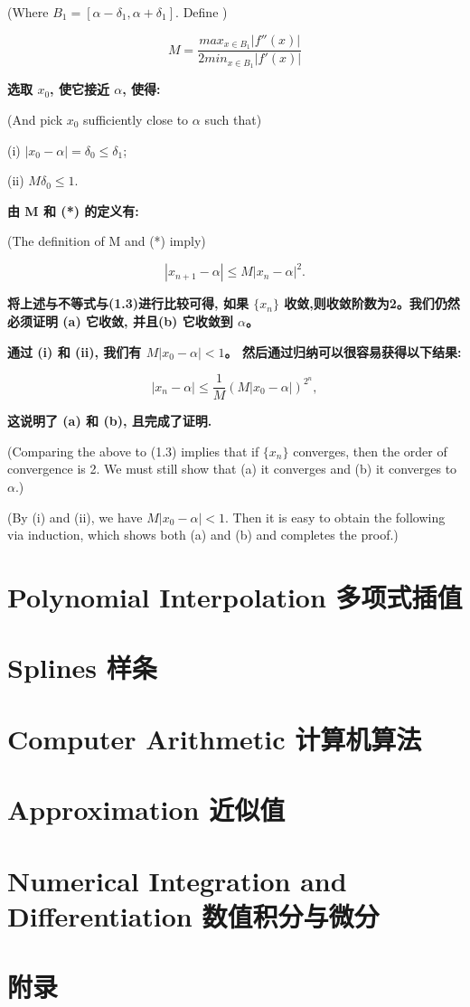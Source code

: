 \documentclass{ctexart}
\begin{document}
(Where $B_1 = [\alpha-\delta _1, \alpha + \delta _1]$. Define )

\[
M = \frac{max_{x \in B_1}|f''(x)|}{2min_{x \in B_1}|f'(x)|}
\]

\textbf{选取 $x_0$, 使它接近 $\alpha$, 使得:}

(And pick $x_0$ sufficiently close to $\alpha$ such that)

(i) $|x_0 - \alpha| = \delta_0 \le \delta_1$;

(ii) $M \delta_0 \le 1$.

\textbf{由 M 和 (*) 的定义有:}

(The definition of M and (*) imply)

\[
|x_{n+1} - \alpha| \le M|x_n - \alpha|^2.
\]

\textbf{将上述与不等式与(1.3)进行比较可得, 如果 $\{x_n\}$ 收敛,则收敛阶数为2。我们仍然必须证明 (a) 它收敛, 并且(b) 它收敛到 $\alpha$。}

\textbf{通过 (i) 和 (ii), 我们有 $M|x_0 − \alpha| < 1$。 然后通过归纳可以很容易获得以下结果:}

\[
|x_n - \alpha| \le \frac{1}{M}(M|x_0 - \alpha|)^{2^n},
\]

\textbf{这说明了 (a) 和 (b), 且完成了证明.}

(Comparing the above to (1.3) implies that if $\{x_n\}$ converges, then the order of convergence is 2. We must still show that (a) it converges and (b) it converges to $\alpha$.)

(By (i) and (ii), we have $M |x_0 − \alpha| < 1$. Then it is easy to obtain the following via induction, which shows both (a) and (b) and completes the proof.)


\section{Polynomial Interpolation 多项式插值}
\section{Splines 样条}
\section{Computer Arithmetic 计算机算法}
\section{Approximation 近似值}
\section{Numerical Integration and Differentiation 数值积分与微分}
\section{附录}
\end{document}
